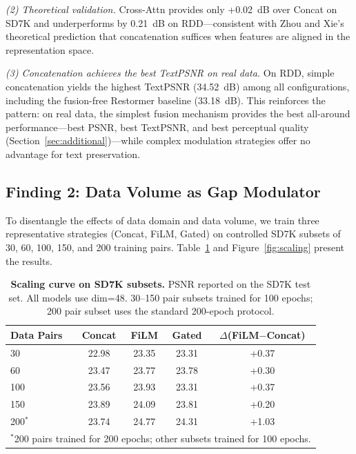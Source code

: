 \documentclass[pdflatex,sn-basic,Numbered]{sn-jnl}
\theoremstyle{thmstyleone}
\theoremstyle{thmstyletwo}
\theoremstyle{thmstylethree}
\begin{document}
\textit{(2) Theoretical validation.}
Cross-Attn provides only +0.02~dB over Concat on SD7K and underperforms by 0.21~dB on RDD---consistent with Zhou and Xie's~\cite{zhou2026feature} theoretical prediction that concatenation suffices when features are aligned in the representation space.

\textit{(3) Concatenation achieves the best TextPSNR on real data.}
On RDD, simple concatenation yields the highest TextPSNR (34.52~dB) among all configurations, including the fusion-free Restormer baseline (33.18~dB).
This reinforces the pattern: on real data, the simplest fusion mechanism provides the best all-around performance---best PSNR, best TextPSNR, and best perceptual quality (Section~\ref{sec:additional})---while complex modulation strategies offer no advantage for text preservation.

\subsection{Finding 2: Data Volume as Gap Modulator}\label{sec:scaling}

To disentangle the effects of data domain and data volume, we train three representative strategies (Concat, FiLM, Gated) on controlled SD7K subsets of 30, 60, 100, 150, and 200 training pairs.
Table~\ref{tab:scaling} and Figure~\ref{fig:scaling} present the results.

\begin{table}[t]
\caption{\textbf{Scaling curve on SD7K subsets.} PSNR reported on the SD7K test set. All models use dim=48. 30--150 pair subsets trained for 100 epochs; 200 pair subset uses the standard 200-epoch protocol.}
\label{tab:scaling}
\begin{tabular}{@{}lcccc@{}}
\toprule
\textbf{Data Pairs} & \textbf{Concat} & \textbf{FiLM} & \textbf{Gated} & \textbf{$\Delta$(FiLM$-$Concat)} \\
\midrule
30  & 22.98 & 23.35 & 23.31 & +0.37 \\
60  & 23.47 & 23.77 & 23.78 & +0.30 \\
100 & 23.56 & 23.93 & 23.31 & +0.37 \\
150 & 23.89 & 24.09 & 23.81 & +0.20 \\
200$^*$ & 23.74 & 24.77 & 24.31 & +1.03 \\
\bottomrule
\multicolumn{5}{l}{\small $^*$200 pairs trained for 200 epochs; other subsets trained for 100 epochs.} \\
\end{tabular}
\end{table}
\end{document}
